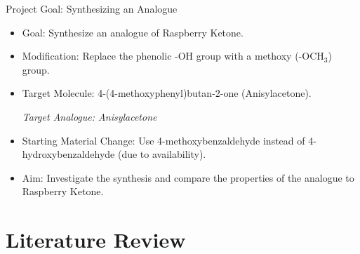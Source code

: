 \documentclass[10pt]{beamer}
\begin{document}
\begin{frame}{Project Goal: Synthesizing an Analogue}
    \begin{itemize}
        \item Goal: Synthesize an analogue of Raspberry Ketone.
        \item Modification: Replace the phenolic -OH group with a methoxy (-OCH$_3$) group.
        \item Target Molecule: 4-(4-methoxyphenyl)butan-2-one (Anisylacetone).
            \begin{center}
                 \vspace{0.5em} %
                 \textit{Target Analogue: Anisylacetone} %
            \end{center}
        \item Starting Material Change: Use 4-methoxybenzaldehyde instead of 4-hydroxybenzaldehyde (due to availability).
        \item Aim: Investigate the synthesis and compare the properties of the analogue to Raspberry Ketone.
    \end{itemize}
\end{frame}

\section{Literature Review}
\end{document}
